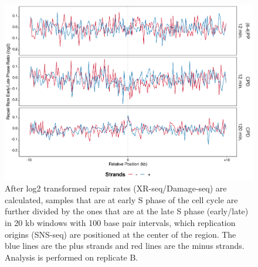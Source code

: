 \begin{figure}[H]
\begin{center}
\includegraphics[width=\textwidth]{Chapters/7_appendix/figures/supfig57}
\caption[Repair rate early/late ratio of replication origins in 20 kb (replicate B).]{After log2 transformed repair rates (XR-seq/Damage-seq) are calculated, samples that are at early S phase of the cell cycle are further divided by the ones that are at the late S phase (early/late) in 20 kb windows with 100 base pair intervals, which replication origins (SNS-seq) are positioned at the center of the region. The blue lines are the plus strands and red lines are the minus strands. Analysis is performed on replicate B.}
\label{supfig:rrel20snsB}
\end{center}
\end{figure}

